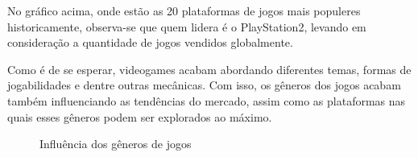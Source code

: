 \documentclass[draft]{agujournal2018}
\begin{document}
No gráfico acima, onde estão as 20 plataformas de jogos mais populeres
historicamente, observa-se que quem lidera é o PlayStation2, levando em
consideração a quantidade de jogos vendidos globalmente.

Como é de se esperar, videogames acabam abordando diferentes temas,
formas de jogabilidades e dentre outras mecânicas. Com isso, os gêneros
dos jogos acabam também influenciando as tendências do mercado, assim
como as plataformas nas quais esses gêneros podem ser explorados ao
máximo.

\begin{figure}[h]
\caption{Influência dos gêneros de jogos}\label{fig:unnamed-chunk-6}
\end{figure}
\end{document}
